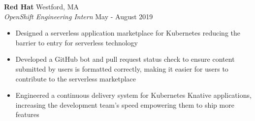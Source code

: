 \documentclass[10pt]{article}
\begin{document}
\begin{flushleft}
    
	\textbf{Red Hat} \hfill Westford, MA \\
	\textit{OpenShift Engineering Intern} \hfill May - August 2019 \\
	\begin{itemize}
        \item Designed a serverless application marketplace for Kubernetes reducing the barrier to entry for serverless technology
        
    	\item Developed a GitHub bot and pull request status check to ensure content submitted by users is formatted correctly, making it easier for users to contribute to the serverless marketplace
        
		\item Engineered a continuous delivery system for Kubernetes Knative applications, increasing the development team's speed empowering them to ship more features
	\end{itemize}






\end{flushleft}
\end{document}
